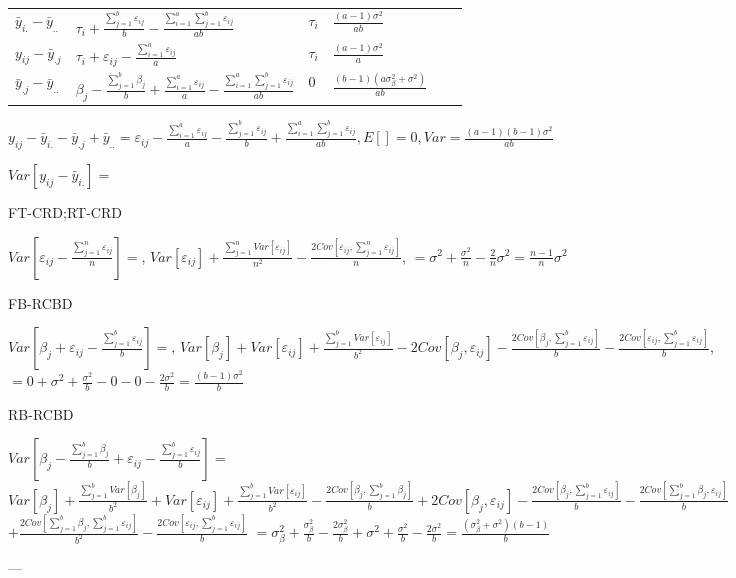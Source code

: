 \documentclass[10pt,portrait]{article}
\begin{document}
\begin{multicols}{2}
\begin{tabular}{l|l|l|l|l|l}
$\bar y_{i.}-\bar y_{..}$ & $\tau_{i}+\frac{\sum_{j=1}^b\varepsilon_{ij}}b-\frac{\sum_{i=1}^a\sum_{j=1}^b\varepsilon_{ij}}{ab}$ & $\tau_i$ & $\frac{(a-1)\sigma^2}{ab}$\\
$y_{ij}-\bar y_{.j}$ & $\tau_{i}+\varepsilon_{ij}-\frac{\sum_{i=1}^a\varepsilon_{ij}}a$ & $\tau_i$ & $\frac{(a-1)\sigma^2}a$\\
$\bar y_{.j}-\bar y_{..}$ & $\beta_j-\frac{\sum_{j=1}^b\beta_j}{b}+\frac{\sum_{i=1}^a\varepsilon_{ij}}a-\frac{\sum_{i=1}^a\sum_{j=1}^b\varepsilon_{ij}}{ab}$ & $0$ & $\frac{(b-1)(a\sigma_{\beta}^2+\sigma^2)}{ab}$\\
\end{tabular}

$y_{ij}-\bar y_{i.}-\bar y_{.j}+\bar y_{..}=\varepsilon_{ij}-\frac{\sum_{i=1}^a\varepsilon_{ij}}a-\frac{\sum_{j=1}^b\varepsilon_{ij}}b+\frac{\sum_{i=1}^a\sum_{j=1}^b\varepsilon_{ij}}{ab},E[]=0, Var=\frac{(a-1)(b-1)\sigma^2}{ab}$



\end{multicols}

$Var[y_{ij}-\bar y_{i.}]=$

FT-CRD;RT-CRD

$Var[ε_{ij}-\frac{\sum_{j=1}^nε_{ij}}n]=$,
$Var[ε_{ij}]+\frac{\sum_{j=1}^nVar[ε_{ij}]}{n^2}-\frac{2Cov[ε_{ij},\sum_{j=1}^nε_{ij}]}n$,
$=\sigma^2+\frac{\sigma^2}n-\frac2n\sigma^2=\frac{n-1}n\sigma^2$

FB-RCBD

$Var[\beta_{j}+ε_{ij}-\frac{\sum_{j=1}^bε_{ij}}b]=$,
$Var[\beta_{j}]+Var[ε_{ij}]+\frac{\sum_{j=1}^bVar[ε_{ij}]}{b^2}-2Cov[\beta_{j},ε_{ij}]-\frac{2Cov[\beta_{j},\sum_{j=1}^bε_{ij}]}b-\frac{2Cov[ε_{ij},\sum_{j=1}^bε_{ij}]}b$,
$=0+\sigma^2+\frac{\sigma^2}b-0-0-\frac{2\sigma^2}b=\frac{(b-1)\sigma^2}b$

RB-RCBD

$Var[\beta_{j}-\frac{\sum_{j=1}^b\beta_{j}}b+ε_{ij}-\frac{\sum_{j=1}^bε_{ij}}b]=$
$Var[\beta_{j}]+\frac{\sum_{j=1}^bVar[\beta_{j}]}{b^2}+Var[ε_{ij}]+\frac{\sum_{j=1}^bVar[ε_{ij}]}{b^2}-\frac{2Cov[\beta_{j},\sum_{j=1}^b\beta_{j}]}b+2Cov[\beta_{j},ε_{ij}]-\frac{2Cov[\beta_{j},\sum_{j=1}^bε_{ij}]}b-\frac{2Cov[\sum_{j=1}^b\beta_{j},ε_{ij}]}b$
$+\frac{2Cov[\sum_{j=1}^b\beta_{j},\sum_{j=1}^bε_{ij}]}{b^2}-\frac{2Cov[ε_{ij},\sum_{j=1}^bε_{ij}]}b$
$=\sigma_{\beta}^2+\frac{\sigma_{\beta}^2}{b}-\frac{2\sigma_{\beta}^2}{b}+\sigma^2+\frac{\sigma^2}b-\frac{2\sigma^2}b=\frac{(\sigma_{\beta}^2+\sigma^2)(b-1)}b$

 ---
\end{document}
